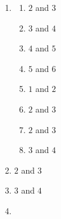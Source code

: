 \begin{eocsolutions}{}
{\begin{enumerate}[itemsep=6pt, label=\textbf{\arabic*}. ]
\item %
\begin{multicols}{2}
    \begin{enumerate}[noitemsep, label=\textbf{(\alph*)} ] 
\item $2$ and $3$
\item $3$ and $4$
\item $4$ and $5$
\item $5$ and $6$
\item $1$ and $2$
\item $2$ and $3$
\item $2$ and $3$
\item $3$ and $4$
    \end{enumerate}
\end{multicols}

\item $2$ and $3$%
\item $3$ and $4$%

\item %
\begin{multicols}{2}
\begin{enumerate}[itemsep=5pt, label=\textbf{(\alph*)} ] 


\end{enumerate}
\end{multicols}
\end{enumerate}}
\end{eocsolutions}
